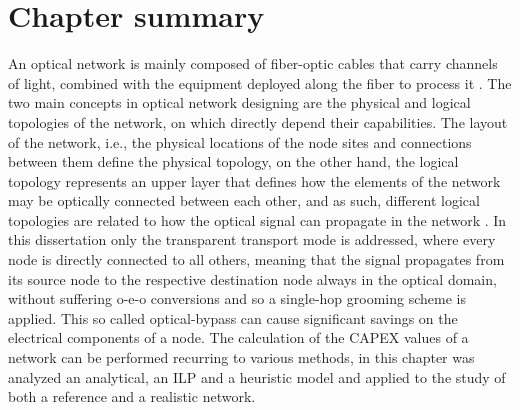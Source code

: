 \section{Chapter summary}
\vspace{11pt}
An optical network is mainly composed of fiber-optic cables that carry channels of light, combined with the equipment deployed along the fiber to process it \cite{SimmonsJane2008}. The two main concepts in optical network designing are the physical and logical topologies of the network, on which directly depend their capabilities. The layout of the network, i.e., the physical locations of the node sites and connections between them define the physical topology, on the other hand, the logical topology represents an upper layer that defines how the elements of the network may be optically connected between each other, and as such, different logical topologies are related to how the optical signal can propagate in the network \cite{Vasco}. In this dissertation only the transparent transport mode is addressed, where every node is directly connected to all others, meaning that the signal propagates from its source node to the respective destination node always in the optical domain, without suffering \gls{o-e-o} conversions and so a single-hop grooming scheme is applied. This so called optical-bypass can cause significant savings on the electrical components of a node. The calculation of the CAPEX values of a network can be performed recurring to various methods, in this chapter was analyzed an analytical, an ILP and a heuristic model and applied to the study of both a reference and a realistic network. 

\cleardoublepage